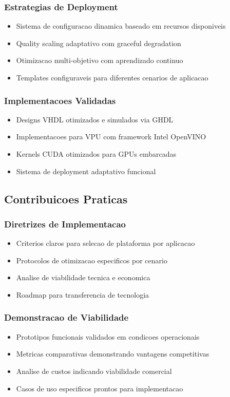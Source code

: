 \subsubsection{Estrategias de Deployment}
\begin{itemize}
    \item Sistema de configuracao dinamica baseado em recursos disponiveis
    \item Quality scaling adaptativo com graceful degradation
    \item Otimizacao multi-objetivo com aprendizado continuo
    \item Templates configuraveis para diferentes cenarios de aplicacao
\end{itemize}

\subsubsection{Implementacoes Validadas}
\begin{itemize}
    \item Designs VHDL otimizados e simulados via GHDL
    \item Implementacoes para VPU com framework Intel OpenVINO
    \item Kernels CUDA otimizados para GPUs embarcadas
    \item Sistema de deployment adaptativo funcional
\end{itemize}

\subsection{Contribuicoes Praticas}

\subsubsection{Diretrizes de Implementacao}
\begin{itemize}
    \item Criterios claros para selecao de plataforma por aplicacao
    \item Protocolos de otimizacao especificos por cenario
    \item Analise de viabilidade tecnica e economica
    \item Roadmap para transferencia de tecnologia
\end{itemize}

\subsubsection{Demonstracao de Viabilidade}
\begin{itemize}
    \item Prototipos funcionais validados em condicoes operacionais
    \item Metricas comparativas demonstrando vantagens competitivas
    \item Analise de custos indicando viabilidade comercial
    \item Casos de uso especificos prontos para implementacao
\end{itemize}

